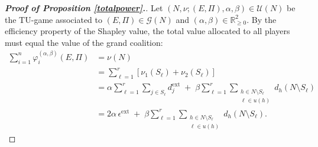 \documentclass[preprint,11pt,authoryear]{elsarticle}
\theoremstyle{plain}
\begin{document}
\begin{proof}[\bf Proof of Proposition \ref{totalpower}.]
	Let \( (N, \nu; (E, \Pi), \alpha, \beta) \in \mathcal{U}(N) \) be the TU-game associated to $(E, \Pi)\in\mathcal{G}(N)$ and $(\alpha, \beta)\in\mathbb{R}_{\geq0}^2$. By the efficiency property of the Shapley value, the total value allocated to all players must equal the value of the grand coalition:
	\begin{align*}
		\sum_{i=1}^n \varphi_i^{(\alpha,\beta)}(E,\Pi)
		&= \nu(N) \\
		&= \sum_{\ell=1}^r \left[ \nu_1(S_\ell) + \nu_2(S_\ell) \right] \\
		&= \alpha \sum_{\ell=1}^r \sum_{j \in S_\ell} d_j^{\mathrm{ext}} 
		\; + \; \beta \sum_{\ell=1}^r \sum_{\substack{h \in N \setminus S_\ell \\ \ell \in u(h)}} d_h(N \setminus S_\ell) \\
		&= 2\alpha\, \epsilon^{\mathrm{ext}} 
		\; + \; \beta \sum_{\ell=1}^r \sum_{\substack{h \in N \setminus S_\ell \\ \ell \in u(h)}} d_h(N \setminus S_\ell).
	\end{align*}
\end{proof}


\end{document}
